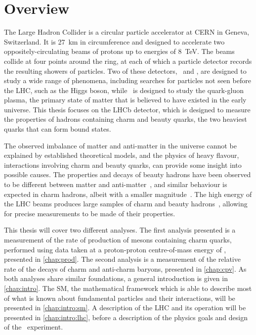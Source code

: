 \chapter{Overview}
\label{chap:intro:overview}

The Large Hadron Collider is a circular particle accelerator at CERN in Geneva, 
Switzerland.
It is \SI{27}{\kilo\metre} in circumference and designed to accelerate two 
oppositely-circulating beams of protons up to energies of \SI{8}{\TeV}.
The beams collide at four points around the ring, at each of which a particle 
detector records the resulting showers of particles.
Two of these detectors, \atlas\ and \cms, are designed to study a wide range of 
phenomena, including searches for particles not seen before the \ac{LHC}, such 
as the Higgs boson, while \alice\ is designed to study the quark-gluon plasma, 
the primary state of matter that is believed to have existed in the early 
universe.
This thesis focuses on the LHCb detector, which is designed to measure the 
properties of hadrons containing charm and beauty quarks, the two heaviest 
quarks that can form bound states.

The observed imbalance of matter and anti-matter in the universe cannot be 
explained by established theoretical models, and the physics of heavy flavour, 
interactions involving charm and beauty quarks, can provide some insight into 
possible causes.
The properties and decays of beauty hadrons have been observed to be different 
between matter and 
anti-matter~\cite{Aubert:2001nu,Abe:2001xe,Aaij:2012kz,Aaij:2013iua,Aaij:2016cla}, 
and similar behaviour is expected in charm hadrons, albeit with a smaller 
magnitude~\cite{Grossman:2006jg}.
The high energy of the \ac{LHC} beams produces large samples of charm and 
beauty hadrons~\cite{LHCb-PAPER-2012-041,LHCb-PAPER-2013-004}, allowing for 
precise measurements to be made of their properties.

This thesis will cover two different analyses.
The first analysis presented is a measurement of the rate of production of 
mesons containing charm quarks, performed using data taken at a proton-proton 
centre-of-mass energy of \runtwocom, presented in \cref{chap:prod}.
The second analysis is a measurement of the relative rate of the decays of 
charm and anti-charm baryons, presented in \cref{chap:cpv}.
As both analyses share similar foundations, a general introduction is given in 
\cref{chap:intro}.
The \acl{SM}, the mathematical framework which is able to describe most of what 
is known about fundamental particles and their interactions, will be presented 
in \cref{chap:intro:sm}.
A description of the \acl{LHC} and its operation will be presented in 
\cref{chap:intro:lhc}, before a description of the physics goals and design of 
the \lhcb\ experiment.
